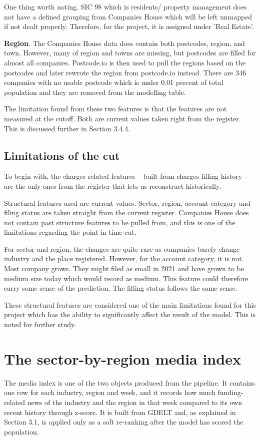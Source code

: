 \documentclass[ %
                    author={Natchalin Iwsakul \\ Inkaphol Siriwongwattana \\ Tanaphan Kummaraphat \\ Patorn Srisupap},
                supervisor={Fernando Moreno-Pino},
                    degree={MSc},
                     title={Propensity Modelling for SME Commercial Lending Using Open Public Data},
                  subtitle={Companies House filings and GDELT media coverage as predictors of first-time borrowing},
                      type={},
                      year={2026}]{dissertation}
\begin{document}
  One thing worth noting. SIC 98 which is residents/ property management does not have a defined grouping from Companies House which will be left unmapped if not dealt properly. Therefore, for the project, it is assigned under 'Real Estate'.

  \textbf{Region}. The Companies House data does contain both postcodes, region, and town. However, many of region and towns are missing, but postcodes are filled for almost all companies. Postcode.io is then used to pull the regions based on the postcodes and later rewrote the region from postcode.io instead. There are 346 companies with no usable postcode which is under 0.01 percent of total population and they are removed from the modelling table.

  The limitation found from these two features is that the features are not measured at the cutoff. Both are current values taken right from the register. This is discussed further in Section 3.4.4.
  
  \subsection{Limitations of the cut}
  To begin with, the charges related features -- built from charges filling history -- are the only ones from the register that lets us reconstruct historically. 

  Structural features used are current values. Sector, region, account category and filing status are taken straight from the current register. Companies House does not contain past structure features to be pulled from, and this is one of the limitations regarding the point-in-time cut.

  For sector and region, the changes are quite rare as companies barely change industry and the place registered. However, for the account category, it is not. Most company grows. They might filed as small in 2021 and have grown to be medium size today which would record as medium. This feature could therefore carry some sense of the prediction. The filling status follows the same sense.

  These structural features are considered one of the main limitations found for this project which has the ability to significantly affect the result of the model. This is noted for further study.

\section{The sector-by-region media index}     \label{sec:mediaindex}
    The media index is one of the two objects produced from the pipeline. It contains one row for each industry, region and week, and it records how much funding-related news of the industry and the region in that week compared to its own recent history through z-score. It is built from GDELT and, as explained in Section 3.1, is applied only as a soft re-ranking after the model has scored the population.
\end{document}
